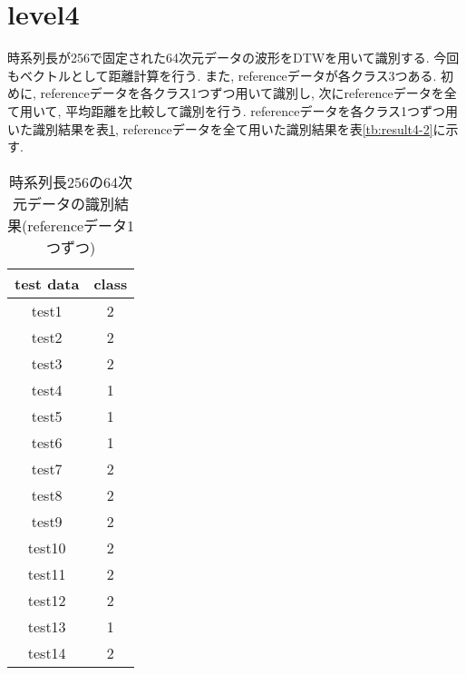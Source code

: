 	\section{level4}
	    時系列長が256で固定された64次元データの波形をDTWを用いて識別する.
        今回もベクトルとして距離計算を行う.
        また, referenceデータが各クラス3つある.
        初めに, referenceデータを各クラス1つずつ用いて識別し,
        次にreferenceデータを全て用いて, 平均距離を比較して識別を行う.
        referenceデータを各クラス1つずつ用いた識別結果を表\ref{tb:result4-1},
        referenceデータを全て用いた識別結果を表\ref{tb:result4-2}に示す.

        \begin{table}[]
            \centering
            \caption{時系列長256の64次元データの識別結果(referenceデータ1つずつ)}
            \begin{tabular}{|c|c|}
                \hline
                test data & class \\ \hline
                test1      & 2     \\ \hline
                test2      & 2     \\ \hline
                test3      & 2     \\ \hline
                test4      & 1     \\ \hline
                test5      & 1     \\ \hline
                test6      & 1     \\ \hline
                test7      & 2     \\ \hline
                test8      & 2     \\ \hline
                test9      & 2     \\ \hline
                test10     & 2     \\ \hline
                test11     & 2     \\ \hline
                test12     & 2     \\ \hline
                test13     & 1     \\ \hline
                test14     & 2     \\ \hline
            \end{tabular}
            \label{tb:result4-1}
        \end{table}

